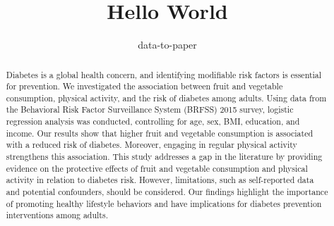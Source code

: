 \documentclass[12pt]{article}
\title{Hello World}
\author{data-to-paper}
\begin{document}
\maketitle

\begin{abstract}
Diabetes is a global health concern, and identifying modifiable risk factors is essential for prevention. We investigated the association between fruit and vegetable consumption, physical activity, and the risk of diabetes among adults. Using data from the Behavioral Risk Factor Surveillance System (BRFSS) 2015 survey, logistic regression analysis was conducted, controlling for age, sex, BMI, education, and income. Our results show that higher fruit and vegetable consumption is associated with a reduced risk of diabetes. Moreover, engaging in regular physical activity strengthens this association. This study addresses a gap in the literature by providing evidence on the protective effects of fruit and vegetable consumption and physical activity in relation to diabetes risk. However, limitations, such as self-reported data and potential confounders, should be considered. Our findings highlight the importance of promoting healthy lifestyle behaviors and have implications for diabetes prevention interventions among adults.
\end{abstract}
\end{document}
